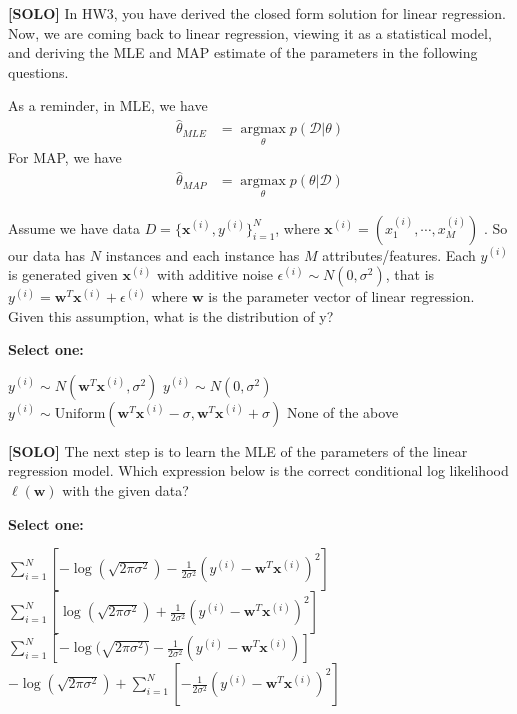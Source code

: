 \documentclass[11pt,addpoints,answers]{exam}
\newcommand{\Dc}{\mathcal{D}}
\newcommand \argmax {\operatorname*{argmax}}
\newcommand{\solo}{\textbf{[SOLO]} }
\begin{document}
\begin{questions}
    
    \question[3] \solo In HW3, you have derived the closed form solution for linear regression. Now, we are coming back to linear regression, viewing it as a statistical model, and deriving the MLE and MAP estimate of the parameters in the following questions. 
    
    As a reminder, in MLE, we have
    \begin{align*}
        \hat{\theta}_{MLE} &= \argmax_\theta p(\Dc | \theta)
    \end{align*}
    For MAP, we have
    \begin{align*}
        \hat{\theta}_{MAP} &= \argmax_\theta p(\theta|\Dc)
    \end{align*}
    
    Assume we have data $D = \{\mathbf{x}^{(i)}, y^{(i)}\}_{i=1}^{N}$, where $\mathbf{x}^{(i)} = (x_1^{(i)}, \cdots, x_M^{(i)})$ . So our data has $N$  instances and each instance has $M$  attributes/features. Each $y^{(i)}$ is generated given $\mathbf{x}^{(i)}$ with additive noise $\epsilon^{(i)} \sim N(0, \sigma^2)$, that is $y^{(i)} = \mathbf{w}^T \mathbf{x}^{(i)} + \epsilon^{(i)}$ where $\mathbf{w}$  is the parameter vector of linear regression. Given this assumption, what is the distribution of y? 

    \textbf{Select one:}
    \begin{checkboxes}
        \choice $y^{(i)} \sim N(\mathbf{w}^T \mathbf{x}^{(i)}, \sigma^2)$
        \choice $y^{(i)} \sim N(0, \sigma^2)$
        \choice $y^{(i)} \sim \text{Uniform}(\mathbf{w}^T \mathbf{x}^{(i)} - \sigma,  \mathbf{w}^T \mathbf{x}^{(i)} + \sigma)$
        \choice None of the above
    \end{checkboxes}
    
    
    \question[3] \solo The next step is to learn the MLE of the parameters of the linear regression model. Which expression below is the correct conditional log likelihood $\ell(\mathbf{w})$ with the given data?

    \textbf{Select one:}
    \begin{checkboxes}
        \choice $\sum_{i=1}^{N} [-\log (\sqrt{2\pi\sigma^2}) - \frac{1}{2\sigma^2} (y^{(i)} - \mathbf{w}^T\mathbf{x}^{(i)})^2]$
        \choice $\sum_{i=1}^{N} [\log (\sqrt{2\pi\sigma^2}) + \frac{1}{2\sigma^2} (y^{(i)} - \mathbf{w}^T\mathbf{x}^{(i)})^2]$
        \choice $\sum_{i=1}^{N} [-\log(\sqrt{2\pi\sigma^2)} - \frac{1}{2\sigma^2} (y^{(i)} - \mathbf{w}^T\mathbf{x}^{(i)})]$
        \choice $-\log (\sqrt{2\pi\sigma^2}) + \sum_{i=1}^{N} [-\frac{1}{2\sigma^2} (y^{(i)} - \mathbf{w}^T\mathbf{x}^{(i)})^2]$
    \end{checkboxes}
    

\end{questions}
\end{document}
